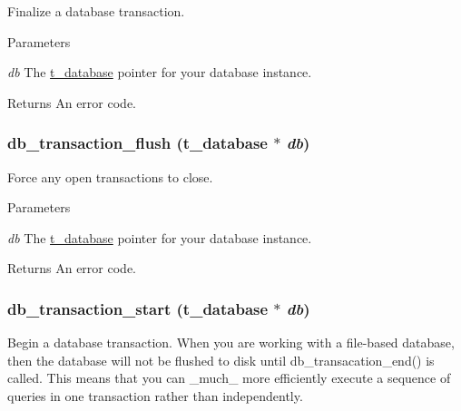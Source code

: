 Finalize a database transaction. 
\begin{DoxyParams}{Parameters}
\item[{\em db}]The \hyperlink{group__database_gad832ea0e5fc292661fd20046cee7e3b3}{t\_\-database} pointer for your database instance. \end{DoxyParams}
\begin{DoxyReturn}{Returns}
An error code. 
\end{DoxyReturn}
\hypertarget{group__database_gabf78d551bd8ed0c81a4881663dc445be}{
\subsubsection[{db\_\-transaction\_\-flush}]{ db\_\-transaction\_\-flush ({\bf t\_\-database} $\ast$ {\em db})}}
\label{group__database_gabf78d551bd8ed0c81a4881663dc445be}


Force any open transactions to close. 
\begin{DoxyParams}{Parameters}
\item[{\em db}]The \hyperlink{group__database_gad832ea0e5fc292661fd20046cee7e3b3}{t\_\-database} pointer for your database instance. \end{DoxyParams}
\begin{DoxyReturn}{Returns}
An error code. 
\end{DoxyReturn}
\hypertarget{group__database_gad14964ae056aa663646f3fc3081b3b3a}{
\subsubsection[{db\_\-transaction\_\-start}]{ db\_\-transaction\_\-start ({\bf t\_\-database} $\ast$ {\em db})}}
\label{group__database_gad14964ae056aa663646f3fc3081b3b3a}


Begin a database transaction. When you are working with a file-\/based database, then the database will not be flushed to disk until db\_\-transacation\_\-end() is called. This means that you can \_\-much\_\- more efficiently execute a sequence of queries in one transaction rather than independently.

